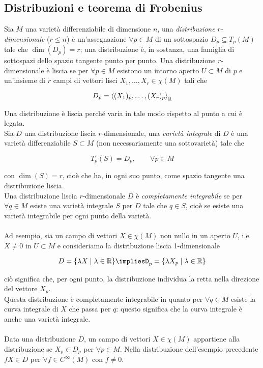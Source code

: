 \subsection{Distribuzioni e teorema di Frobenius}

Sia $ M $ una varietà differenziabile di dimensione $ n $, una \textit{distribuzione} $ r $\textit{-dimensionale} ($ r \leqslant n $) è un'assegnazione $ \forall p \in M $ di un sottospazio $ D_{p} \subseteq T_{p}(M) $ tale che $ \dim(D_{p}) = r $; una distribuzione è, in sostanza, una famiglia di sottospazi dello spazio tangente punto per punto. Una distribuzione $ r $-dimensionale è liscia se per $ \forall p \in M $ esistono un intorno aperto $ U \subset M $ di $ p $ e un'insieme di $ r $ campi di vettori lisci $ X_{1},\dots,X_{r} \in \chi(M) $ tali che

\begin{equation}
	D_{p} = \ev{ (X_{1})_{p}, \dots, (X_{r})_{p} }_{\R}
\end{equation}

Una distribuzione è liscia perché varia in tale modo rispetto al punto a cui è legata.\\
Sia $ D $ una distribuzione liscia $ r $-dimensionale, una \textit{varietà integrale} di $ D $ è una varietà differenziabile $ S \subset M $ (non necessariamente una sottovarietà) tale che

\begin{equation}
	T_{p}(S) = D_{p}, \qquad \forall p \in M
\end{equation}

con $ \dim(S) = r $, cioè che ha, in ogni suo punto, come spazio tangente una distribuzione liscia.\\
Una distribuzione liscia $ r $-dimensionale $ D $ è \textit{completamente integrabile} se per $ \forall q \in M $ esiste una varietà integrale $ S $ per $ D $ tale che $ q \in S $, cioè se esiste una varietà integrabile per ogni punto della varietà.\\\\
%
Ad esempio, sia un campo di vettori $ X \in \chi(M) $ non nullo in un aperto $ U $, i.e. $ X \neq 0 $ in $ U \subset M $ e consideriamo la distribuzione liscia 1-dimensionale

\begin{equation}
	D = \{ \lambda X \mid \lambda \in \R \} %
	\implies%
	D_{p} = \{ \lambda X_{p} \mid \lambda \in \R \}
\end{equation}

ciò significa che, per ogni punto, la distribuzione individua la retta nella direzione del vettore $ X_{p} $.\\
Questa distribuzione è completamente integrabile in quanto per $ \forall q \in M $ esiste la curva integrale di $ X $ che passa per $ q $: questo significa che la curva integrale è anche una varietà integrale.\\\\
%
Data una distribuzione $ D $, un campo di vettori $ X \in \chi(M) $ appartiene alla distribuzione se $ X_{p} \in D_{p} $ per $ \forall p \in M $. Nella distribuzione dell'esempio precedente $ f X \in D $ per $ \forall f \in C^{\infty}(M) $ con $ f \neq 0 $.


